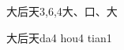 \begin{entry}{大后天}{3,6,4}{⼤、⼝、⼤}
  \begin{phonetics}{大后天}{da4 hou4 tian1}
  \end{phonetics}
\end{entry}
